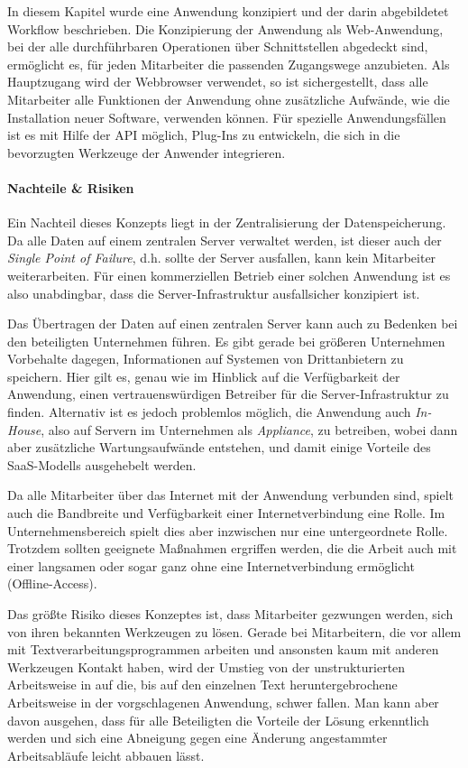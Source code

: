 In diesem Kapitel wurde eine Anwendung konzipiert und der darin abgebildetet Workflow beschrieben. Die Konzipierung der Anwendung als Web-Anwendung, bei der alle durchführbaren Operationen über Schnittstellen abgedeckt sind, ermöglicht es, für jeden Mitarbeiter die passenden Zugangswege anzubieten. Als Hauptzugang wird der Webbrowser verwendet, so ist sichergestellt, dass alle Mitarbeiter alle Funktionen der Anwendung ohne zusätzliche Aufwände, wie die Installation neuer Software, verwenden können. Für spezielle Anwendungsfällen ist es mit Hilfe der API möglich, Plug-Ins zu entwickeln, die sich in die bevorzugten Werkzeuge der Anwender integrieren.

\paragraph{Nachteile \& Risiken} Ein Nachteil dieses Konzepts liegt in der Zentralisierung der Datenspeicherung. Da alle Daten auf einem zentralen Server verwaltet werden, ist dieser auch der \emph{Single Point of Failure}, d.h. sollte der Server ausfallen, kann kein Mitarbeiter weiterarbeiten. Für einen kommerziellen Betrieb einer solchen Anwendung ist es also unabdingbar, dass die Server-Infrastruktur ausfallsicher konzipiert ist. 

Das Übertragen der Daten auf einen zentralen Server kann auch zu Bedenken bei den beteiligten Unternehmen führen. Es gibt gerade bei größeren Unternehmen Vorbehalte dagegen, Informationen auf Systemen von Drittanbietern zu speichern. Hier gilt es, genau wie im Hinblick auf die Verfügbarkeit der Anwendung, einen vertrauenswürdigen Betreiber für die Server-Infrastruktur zu finden. Alternativ ist es jedoch problemlos möglich, die Anwendung auch \emph{In-House}, also auf Servern im Unternehmen als \emph{Appliance}, zu betreiben, wobei dann aber zusätzliche Wartungsaufwände entstehen, und damit einige Vorteile des SaaS-Modells ausgehebelt werden. 

Da alle Mitarbeiter über das Internet mit der Anwendung verbunden sind, spielt auch die Bandbreite und Verfügbarkeit einer Internetverbindung eine Rolle. Im Unternehmensbereich spielt dies aber inzwischen nur eine untergeordnete Rolle. Trotzdem sollten geeignete Maßnahmen ergriffen werden, die die Arbeit auch mit einer langsamen oder sogar ganz ohne eine Internetverbindung ermöglicht (Offline-Access).

Das größte Risiko dieses Konzeptes ist, dass Mitarbeiter gezwungen werden, sich von ihren bekannten Werkzeugen zu lösen. Gerade bei Mitarbeitern, die vor allem mit Textverarbeitungsprogrammen arbeiten und ansonsten kaum mit anderen Werkzeugen Kontakt haben, wird der Umstieg von der unstrukturierten Arbeitsweise in  auf die, bis auf den einzelnen Text heruntergebrochene Arbeitsweise in der vorgschlagenen Anwendung, schwer fallen. Man kann aber davon ausgehen, dass für alle Beteiligten die Vorteile der Lösung erkenntlich werden und sich eine Abneigung gegen eine Änderung angestammter Arbeitsabläufe leicht abbauen lässt.

